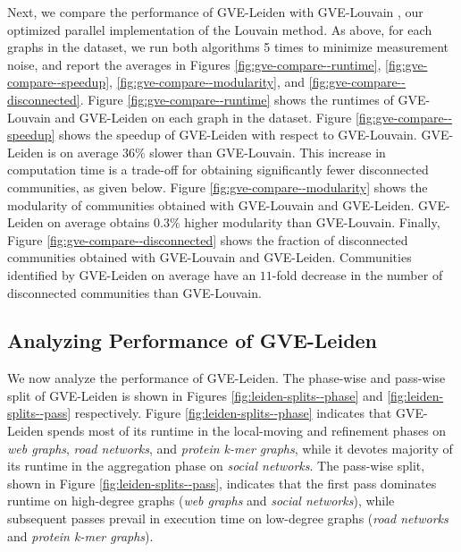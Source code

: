 
Next, we compare the performance of GVE-Leiden with GVE-Louvain \cite{sahu2023gvelouvain}, our optimized parallel implementation of the Louvain method. As above, for each graphs in the dataset, we run both algorithms 5 times to minimize measurement noise, and report the averages in Figures \ref{fig:gve-compare--runtime}, \ref{fig:gve-compare--speedup}, \ref{fig:gve-compare--modularity}, and \ref{fig:gve-compare--disconnected}. Figure \ref{fig:gve-compare--runtime} shows the runtimes of GVE-Louvain and GVE-Leiden on each graph in the dataset. Figure \ref{fig:gve-compare--speedup} shows the speedup of GVE-Leiden with respect to GVE-Louvain. GVE-Leiden is on average $36\%$ slower than GVE-Louvain. This increase in computation time is a trade-off for obtaining significantly fewer disconnected communities, as given below. Figure \ref{fig:gve-compare--modularity} shows the modularity of communities obtained with GVE-Louvain and GVE-Leiden. GVE-Leiden on average obtains $0.3\%$ higher modularity than GVE-Louvain. Finally, Figure \ref{fig:gve-compare--disconnected} shows the fraction of disconnected communities obtained with GVE-Louvain and GVE-Leiden. Communities identified by GVE-Leiden on average have an $11$-fold decrease in the number of disconnected communities than GVE-Louvain.








\subsection{Analyzing Performance of GVE-Leiden}

We now analyze the performance of GVE-Leiden. The phase-wise and pass-wise split of GVE-Leiden is shown in Figures \ref{fig:leiden-splits--phase} and \ref{fig:leiden-splits--pass} respectively. Figure \ref{fig:leiden-splits--phase} indicates that GVE-Leiden spends most of its runtime in the local-moving and refinement phases on \textit{web graphs}, \textit{road networks}, and \textit{protein k-mer graphs}, while it devotes majority of its runtime in the aggregation phase on \textit{social networks}. The pass-wise split, shown in Figure \ref{fig:leiden-splits--pass}, indicates that the first pass dominates runtime on high-degree graphs (\textit{web graphs} and \textit{social networks}), while subsequent passes prevail in execution time on low-degree graphs (\textit{road networks} and \textit{protein k-mer graphs}).

